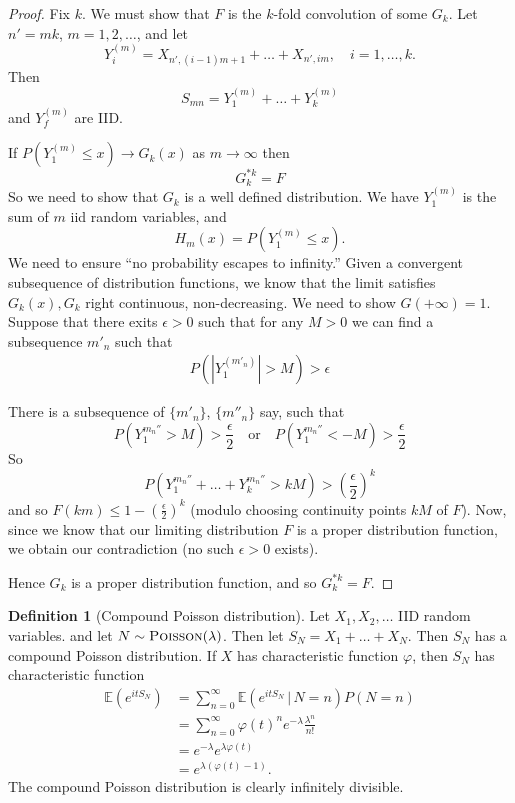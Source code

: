 \documentclass[10pt, oneside, reqno]{amsart}
\theoremstyle{plain}%
\theoremstyle{definition}
\newtheorem{defn}[thm]{Definition}
\theoremstyle{remark}
\newcommand{\given}{ \, | \,}
\renewcommand{\phi}{\varphi}
\newcommand{\E}{\mathbb{E}}
\begin{document}
\begin{proof}	
	Fix $k$.  We must show that $F$ is the $k$-fold convolution of some $G_k$.  Let $n' = mk$, $m = 1, 2, \dots$, and let \[
	Y_i^{(m)} = X_{n', (i - 1)m + 1} + \dots + X_{n', im}, \quad i = 1, \dots, k.	
	\]  Then \[
		S_{mn} = Y_1^{(m)}  + \dots + Y_k^{(m)} 
	\] and $Y_f^{(m)}$ are IID.


	If $P(Y_1^{(m)} \leq x) \rightarrow G_k(x)$ as $m \rightarrow \infty$ then \[
		G^{*k}_k = F
	\]  So we need to show that $G_k$ is a well defined distribution.  We have $Y_{1}^{(m)}$ is the sum of $m$ iid random variables, and \[
		H_m(x) = P(Y_1^{(m)} \leq x).
	\]  We need to ensure ``no probability escapes to infinity.''  Given a convergent subsequence of distribution functions, we know that the limit satisfies $G_k(x), G_k$ right continuous, non-decreasing.  We need to show $G(+\infty) = 1$.  Suppose that there exits $\epsilon > 0$ such that for any $M> 0$ we can find a subsequence $m'_n$ such that \begin{align*}
		P( |Y_1^{(m'_n)}| > M ) > \epsilon
	\end{align*}
	
	There is a subsequence of $\{ m'_n \}$, $\{ m''_n \}$ say, such that \[
		P(Y_1^{m_n''} > M) > \frac{\epsilon}{2} \quad \text{or} \quad P(Y_1^{m_n''} < -M) > \frac{\epsilon}{2}
	\] So \[
		P(Y_1^{m_n''} + \dots + Y_k^{m_n''} > kM) > \left(\frac{\epsilon}{2}\right)^k 
	\] and so $F(km) \leq 1 - \left( \frac{\epsilon}{2}\right)^k$ (modulo choosing continuity points $kM$ of $F$).  Now, since we know that our limiting distribution $F$ is a proper distribution function, we obtain our contradiction (no such $\epsilon > 0$ exists).  
	
	Hence $G_k$ is a proper distribution function, and so $G_k^{*k} = F$.    
\end{proof}
\begin{defn}[Compound Poisson distribution]
	Let $X_1, X_2, \dots$ IID random variables.  and let $N \sim \textsc{Poisson}(\lambda)$.  Then let $S_N = X_1 + \dots + X_N$.  Then $S_N$ has a compound Poisson distribution.  If $X$ has characteristic function $\phi$, then $S_N$ has characteristic function \begin{align*}
		\E(e^{itS_N}) &= \sum_{n = 0}^\infty \E(e^{itS_N} \given N = n) P(N = n) \\
					&= \sum_{n = 0}^\infty \phi(t)^n e^{- \lambda} \frac{\lambda^n}{n!} \\
					&= e^{- \lambda} e^{\lambda \phi(t)} \\
					&= e^{\lambda(\phi(t) - 1)}.
	\end{align*}  The compound Poisson distribution is clearly infinitely divisible.  
\end{defn}
\end{document}
